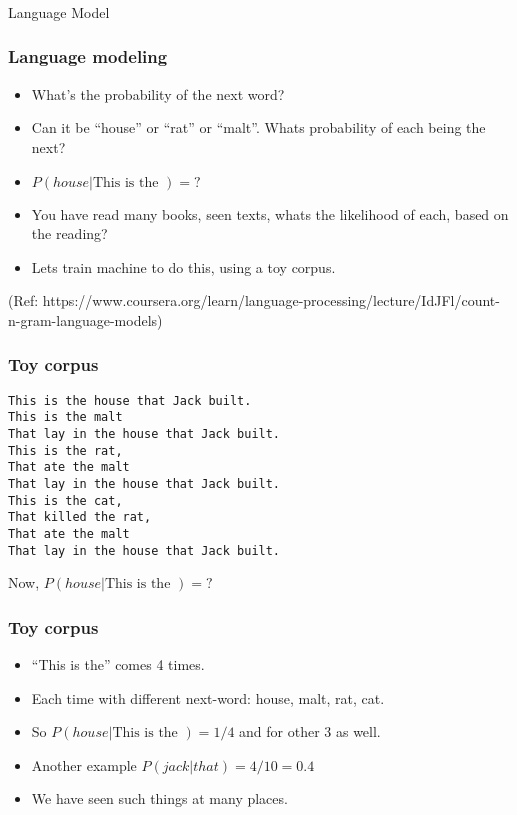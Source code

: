 \begin{frame}[fragile]\frametitle{}

\begin{center}
{\Large Language Model}
\end{center}
\end{frame}


\begin{frame}[fragile]
  \frametitle{Language modeling}
  \begin{itemize}
  \item What's the probability of the next word?
  \item Can it be ``house'' or ``rat'' or ``malt''. Whats probability of each being the next?
    \item $P(house| \text{This is the }) = ?$
	\item You have read many books, seen texts, whats the likelihood of each, based on the reading?
	\item Lets train machine to do this, using a toy corpus.
  	  \end{itemize}
  	  
(Ref: https://www.coursera.org/learn/language-processing/lecture/IdJFl/count-n-gram-language-models)  	  
 \end{frame} 

\begin{frame}[fragile]
  \frametitle{Toy corpus}
  \begin{lstlisting}
This is the house that Jack built.
This is the malt
That lay in the house that Jack built.
This is the rat,
That ate the malt
That lay in the house that Jack built.
This is the cat,
That killed the rat,
That ate the malt
That lay in the house that Jack built.
  	  \end{lstlisting}
  	  
 Now, $P(house| \text{This is the }) = ?$
 
 \end{frame} 

\begin{frame}[fragile]
  \frametitle{Toy corpus}
  \begin{itemize}
  \item ``This is the'' comes 4 times.
  \item Each time with different next-word: house, malt, rat, cat.
  \item So $P(house| \text{This is the }) = 1/4$ and for other 3 as well.
  \item Another example $P(jack|that) = 4/10 = 0.4$
  \item We have seen such things at many places.

  	  \end{itemize}
  	  
 
 \end{frame} 

